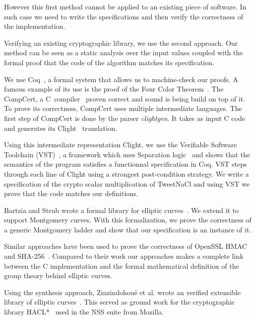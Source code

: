 However this first method cannot be applied to an existing piece of software.
In such case we need to write the specifications and then verify the correctness
of the implementation.

Verifying an existing cryptographic library, we use the second approach.
Our method can be seen as a static analysis over the input values coupled
with the formal proof that the code of the algorithm matches its specification.

We use Coq~\cite{coq-faq}, a formal system that allows us to machine-check our proofs.
A famous example of its use is the proof of the Four Color Theorem~\cite{gonthier2008formal}.
The CompCert, a C~compiler~\cite{Leroy-backend} proven correct and sound is being build on top of it.
To prove its correctness, CompCert uses multiple intermediate languages. The first step of CompCert is done by the parser \textit{clightgen}.
It takes as input C code and generates its Clight~\cite{Blazy-Leroy-Clight-09} translation.

Using this intermediate representation Clight, we use the Verifiable Software Toolchain
(VST)~\cite{2012-Appel}, a framework which uses Separation logic~\cite{1969-Hoare,Reynolds02separationlogic}
and shows that the semantics of the program satisfies a functionnal specification in Coq.
VST steps through each line of Clight using a strongest post-condition strategy.
We write a specification of the crypto scalar multiplication of TweetNaCl and using
VST we prove that the code matches our definitions.

Bartzia and Strub wrote a formal library for elliptic curves~\cite{DBLP:conf/itp/BartziaS14}.
We extend it to support Montgomery curves. With this formalization, we prove the
correctness of a generic Montgomery ladder and show that our specification is an instance of it.



Similar approaches have been used to prove the correctness of OpenSSL HMAC~\cite{Beringer2015VerifiedCA}
and SHA-256~\cite{2015-Appel}. Compared to their work
our approaches makes a complete link between the C implementation and the formal
mathematical definition of the group theory behind elliptic curves.

Using the synthesis approach, Zinzindohou{\'{e}} et al. wrote an verified extensible
library of elliptic curves~\cite{Zinzindohoue2016AVE}. This served as ground work for the
cryptographic library HACL*~\cite{zinzindohoue2017hacl} used in the NSS suite from Mozilla.

